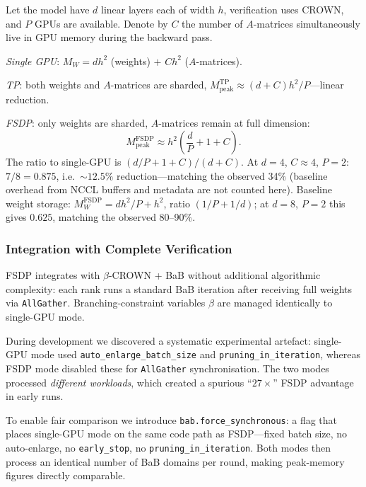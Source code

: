 \documentclass[11pt]{article}
\begin{document}
Let the model have $d$ linear layers each of width $h$, verification uses
CROWN, and $P$ GPUs are available. Denote by $C$ the number of $A$-matrices
simultaneously live in GPU memory during the backward pass.

\emph{Single GPU}: $M_W = d h^2$ (weights) $+$ $C h^2$ ($A$-matrices).

\emph{TP}: both weights and $A$-matrices are sharded,
$M_\text{peak}^\text{TP} \approx (d + C) h^2 / P$---linear reduction.

\emph{FSDP}: only weights are sharded, $A$-matrices remain at full dimension:
\begin{equation}
  M_\text{peak}^\text{FSDP} \approx h^2\!\left(\frac{d}{P} + 1 + C\right).
  \label{eq:fsdp-memory}
\end{equation}
The ratio to single-GPU is $(d/P + 1 + C)/(d + C)$.
At $d{=}4$, $C{\approx}4$, $P{=}2$: $7/8 = 0.875$, i.e.\ ${\sim}12.5\%$
reduction---matching the observed 34\% (baseline overhead from NCCL buffers
and metadata are not counted here). Baseline weight storage:
$M_W^\text{FSDP} = d h^2/P + h^2$, ratio $(1/P + 1/d)$; at $d{=}8$, $P{=}2$
this gives $0.625$, matching the observed 80--90\%.

\subsubsection{Integration with Complete Verification}

FSDP integrates with $\beta$-CROWN + BaB without additional algorithmic
complexity: each rank runs a standard BaB iteration after receiving full weights
via \texttt{AllGather}. Branching-constraint variables $\beta$ are managed
identically to single-GPU mode.

During development we discovered a systematic experimental artefact: single-GPU
mode used \texttt{auto\_enlarge\_batch\_size} and \texttt{pruning\_in\_iteration},
whereas FSDP mode disabled these for \texttt{AllGather} synchronisation. The
two modes processed \emph{different workloads}, which created a spurious
``$27\times$'' FSDP advantage in early runs.

To enable fair comparison we introduce \texttt{bab.force\_synchronous}: a flag
that places single-GPU mode on the same code path as FSDP---fixed batch size,
no auto-enlarge, no \texttt{early\_stop}, no \texttt{pruning\_in\_iteration}.
Both modes then process an identical number of BaB domains per round, making
peak-memory figures directly comparable.

\end{document}
